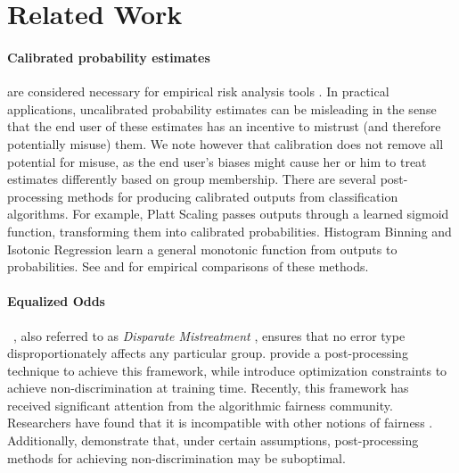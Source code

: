 \section{Related Work}

\paragraph{Calibrated probability estimates} are considered necessary for empirical risk
analysis tools \cite{berk2017fairness,crowson-calibration-risk-scores,dieterich-northpointe-fairness,flores-re-propublica-fair}.
In practical applications, uncalibrated probability estimates can be misleading
in the sense that the end user of these estimates has an incentive to mistrust (and therefore potentially misuse) them.
We note however that calibration does not remove all potential for misuse, as the end user's biases
might cause her or him to treat estimates differently based on group membership.
%
There are several post-processing methods for producing calibrated outputs from classification
algorithms. For example, Platt Scaling \cite{platt1999probabilistic} passes outputs through
a learned sigmoid function, transforming them into calibrated probabilities.
Histogram Binning and Isotonic Regression \cite{zadrozny2001obtaining}
learn a general monotonic function from outputs to probabilities.
See \cite{niculescu2005predicting} and \cite{guo2017calibration} for empirical
comparisons
of these methods.

\paragraph{Equalized Odds}~\cite{hardt2016equality},
also referred to as \emph{Disparate Mistreatment} \cite{zafar2017fairness},
ensures that no error type disproportionately affects any particular group.
\citet{hardt2016equality} provide a post-processing technique to achieve this
framework, while \citet{zafar2017fairness} introduce optimization constraints
to achieve non-discrimination at training time.
Recently, this framework has received significant attention from the algorithmic
fairness community.
Researchers have found that it is incompatible with other notions
of fairness \cite{kleinberg2016inherent,chouldechova2017fair,corbett2017algorithmic}.
Additionally, \citet{woodworth2017learning} demonstrate that, under certain assumptions, post-processing
methods for achieving non-discrimination may be suboptimal.

